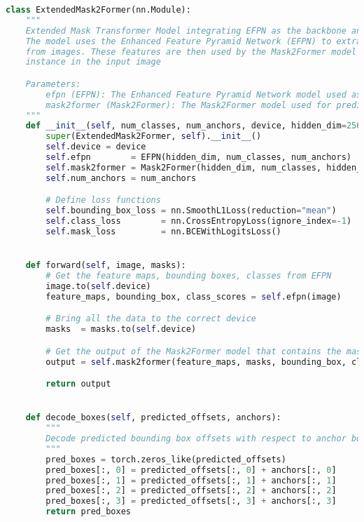 \begin{lstlisting}[language=Python, caption=Extended Masked-Attention Mask Transformer Model Class]
    class ExtendedMask2Former(nn.Module):
    """
    Extended Mask Transformer Model integrating EFPN as the backbone and feature mask generator, with Mask2Former for instance segmentation tasks.
    The model uses the Enhanced Feature Pyramid Network (EFPN) to extract multi-scale feature maps and generate corresponding mask features 
    from images. These features are then used by the Mask2Former model to perform instance segmentation, identifying and delineating each object 
    instance in the input image

    Parameters:
        efpn (EFPN): The Enhanced Feature Pyramid Network model used as the backbone for feature extraction and bounding box training.
        mask2former (Mask2Former): The Mask2Former model used for predicting object instances and their masks based on the features provided by EFPN.
    """
    def __init__(self, num_classes, num_anchors, device, hidden_dim=256, num_queries=100, nheads=16, dim_feedforward=2048, dec_layers=1, mask_dim=100):
        super(ExtendedMask2Former, self).__init__()
        self.device = device
        self.efpn        = EFPN(hidden_dim, num_classes, num_anchors)
        self.mask2former = Mask2Former(hidden_dim, num_classes, hidden_dim, num_queries, nheads, dim_feedforward, dec_layers, mask_dim)
        self.num_anchors = num_anchors

        # Define loss functions
        self.bounding_box_loss = nn.SmoothL1Loss(reduction="mean")
        self.class_loss        = nn.CrossEntropyLoss(ignore_index=-1)
        self.mask_loss         = nn.BCEWithLogitsLoss()


    def forward(self, image, masks):
        # Get the feature maps, bounding boxes, classes from EFPN
        image.to(self.device)
        feature_maps, bounding_box, class_scores = self.efpn(image)   

        # Bring all the data to the correct device
        masks  = masks.to(self.device)

        # Get the output of the Mask2Former model that contains the masks, classes
        output = self.mask2former(feature_maps, masks, bounding_box, class_scores)

        return output


    def decode_boxes(self, predicted_offsets, anchors):
        """
        Decode predicted bounding box offsets with respect to anchor boxes.
        """
        pred_boxes = torch.zeros_like(predicted_offsets)
        pred_boxes[:, 0] = predicted_offsets[:, 0] + anchors[:, 0]
        pred_boxes[:, 1] = predicted_offsets[:, 1] + anchors[:, 1]
        pred_boxes[:, 2] = predicted_offsets[:, 2] + anchors[:, 2]
        pred_boxes[:, 3] = predicted_offsets[:, 3] + anchors[:, 3]
        return pred_boxes


\end{lstlisting}
